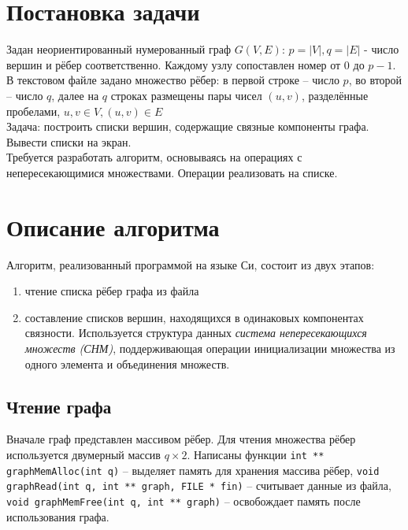 \documentclass[zuev-report.tex]{subfiles}
\begin{document}
	
\section{Постановка задачи}
Задан неориентированный нумерованный граф $G(V, E)$: $p = |V|, q = |E|$ - число вершин и рёбер соответственно. Каждому узлу сопоставлен номер от $0$ до $p - 1$. В текстовом файле задано множество рёбер: в первой строке -- число $p$, во второй -- число $q$, далее на $q$ строках размещены пары чисел $(u, v)$, разделённые пробелами, $u, v \in V, (u, v) \in E$\\
Задача: построить списки вершин, содержащие связные компоненты графа. Вывести списки на экран.\\
Требуется разработать алгоритм, основываясь на операциях с непересекающимися множествами. Операции реализовать на списке.\\

\newpage
\section{Описание алгоритма}
Алгоритм, реализованный программой на языке Си, состоит из двух этапов:
\begin{enumerate}
	\item чтение списка рёбер графа из файла
	\item составление списков вершин, находящихся в одинаковых компонентах связности. Используется структура данных \textit{система непересекающихся множеств (СНМ)}, поддерживающая операции инициализации множества из одного элемента и объединения множеств.
\end{enumerate}
\subsection{Чтение графа}
Вначале граф представлен массивом рёбер. Для чтения множества рёбер используется двумерный массив $q\times 2$. Написаны функции \lstinline|int ** graphMemAlloc(int q)|  -- выделяет память для хранения массива рёбер, \lstinline|void graphRead(int q, int ** graph, FILE * fin)| -- считывает данные из файла,  \lstinline|void graphMemFree(int q, int ** graph)| -- освобождает память после использования графа.
\end{document}
